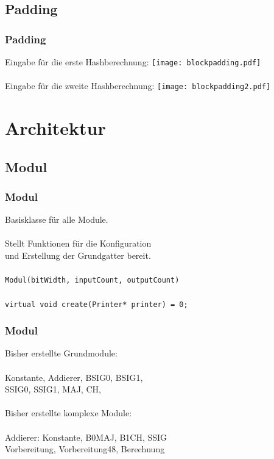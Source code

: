 \documentclass{beamer}
\begin{document}
\subsection{Padding}
  \begin{frame}
    \frametitle{Padding}
    Eingabe für die erste Hashberechnung:
    \texttt{[image: blockpadding.pdf]}\\
    ~\\
    Eingabe für die zweite Hashberechnung:
    \texttt{[image: blockpadding2.pdf]}\\
  \end{frame}
\section{Architektur}
\subsection{Modul}
  \begin{frame}
    \frametitle{Modul}
    \begin{figure}
    \end{figure}
    Basisklasse für alle Module.\\
    ~\\
    Stellt Funktionen für die Konfiguration\\
    und Erstellung der Grundgatter bereit.\\
    ~\\
    \texttt{Modul(bitWidth, inputCount, outputCount)}\\
    ~\\
    \texttt{virtual void create(Printer* printer) = 0;}\\
  \end{frame}
  \begin{frame}
    \frametitle{Modul}
    \begin{figure}
    \end{figure}
    Bisher erstellte Grundmodule:\\
    ~\\
    Konstante, Addierer, BSIG0, BSIG1,\\
    SSIG0, SSIG1, MAJ, CH,\\
    ~\\
    Bisher erstellte komplexe Module:\\
    ~\\
    Addierer: Konstante, B0MAJ, B1CH, SSIG\\
    Vorbereitung, Vorbereitung48, Berechnung\\
  \end{frame}
\end{document}

